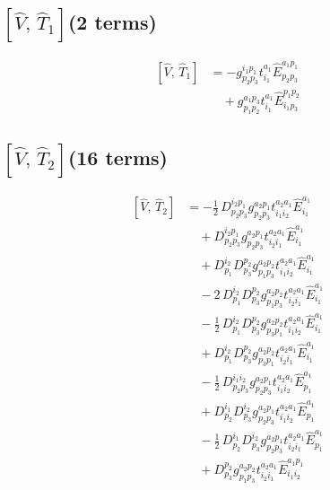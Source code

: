 \documentclass[11pt]{article}
\begin{document}
\subsection*{$\left[\hat{V},\, \hat{T}_{1}\right]$\quad(2 terms)}
\begin{align}
\left[\hat{V},\, \hat{T}_{1}\right] &= - g^{i_{1}p_{1}}_{p_{2}p_{3}} t^{a_{1}}_{i_{1}} \hat{E}^{a_{1}p_{1}}_{p_{2}p_{3}} \\
&\quad + g^{a_{1}p_{3}}_{p_{1}p_{2}} t^{a_{1}}_{i_{1}} \hat{E}^{p_{1}p_{2}}_{i_{1}p_{3}}
\end{align}
\subsection*{$\left[\hat{V},\, \hat{T}_{2}\right]$\quad(16 terms)}
\begin{align}
\left[\hat{V},\, \hat{T}_{2}\right] &= - \tfrac{1}{2}\, D^{i_{2}p_{1}}_{p_{2}p_{3}} g^{a_{2}p_{1}}_{p_{2}p_{3}} t^{a_{2}a_{1}}_{i_{1}i_{2}} \hat{E}^{a_{1}}_{i_{1}} \\
&\quad + D^{i_{2}p_{1}}_{p_{2}p_{3}} g^{a_{2}p_{1}}_{p_{2}p_{3}} t^{a_{2}a_{1}}_{i_{2}i_{1}} \hat{E}^{a_{1}}_{i_{1}} \\
&\quad + D^{i_{2}}_{p_{1}} D^{p_{2}}_{p_{3}} g^{a_{2}p_{2}}_{p_{1}p_{3}} t^{a_{2}a_{1}}_{i_{1}i_{2}} \hat{E}^{a_{1}}_{i_{1}} \\
&\quad - 2\, D^{i_{2}}_{p_{1}} D^{p_{2}}_{p_{3}} g^{a_{2}p_{2}}_{p_{1}p_{3}} t^{a_{2}a_{1}}_{i_{2}i_{1}} \hat{E}^{a_{1}}_{i_{1}} \\
&\quad - \tfrac{1}{2}\, D^{i_{2}}_{p_{1}} D^{p_{2}}_{p_{3}} g^{a_{2}p_{2}}_{p_{3}p_{1}} t^{a_{2}a_{1}}_{i_{1}i_{2}} \hat{E}^{a_{1}}_{i_{1}} \\
&\quad + D^{i_{2}}_{p_{1}} D^{p_{2}}_{p_{3}} g^{a_{2}p_{2}}_{p_{3}p_{1}} t^{a_{2}a_{1}}_{i_{2}i_{1}} \hat{E}^{a_{1}}_{i_{1}} \\
&\quad - \tfrac{1}{2}\, D^{i_{1}i_{2}}_{p_{2}p_{3}} g^{a_{2}p_{1}}_{p_{2}p_{3}} t^{a_{2}a_{1}}_{i_{1}i_{2}} \hat{E}^{a_{1}}_{p_{1}} \\
&\quad + D^{i_{1}}_{p_{2}} D^{i_{2}}_{p_{3}} g^{a_{2}p_{1}}_{p_{2}p_{3}} t^{a_{2}a_{1}}_{i_{1}i_{2}} \hat{E}^{a_{1}}_{p_{1}} \\
&\quad - \tfrac{1}{2}\, D^{i_{1}}_{p_{2}} D^{i_{2}}_{p_{3}} g^{a_{2}p_{1}}_{p_{2}p_{3}} t^{a_{2}a_{1}}_{i_{2}i_{1}} \hat{E}^{a_{1}}_{p_{1}} \\
&\quad + D^{p_{2}}_{p_{3}} g^{a_{2}p_{2}}_{p_{1}p_{3}} t^{a_{2}a_{1}}_{i_{2}i_{1}} \hat{E}^{a_{1}p_{1}}_{i_{1}i_{2}} \\

\end{align}
\end{document}

